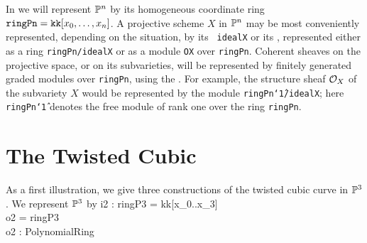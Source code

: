 In \Mtwo we will represent  $\P^n$ by its
homogeneous coordinate ring ${\tt ringPn} = {\tt kk}[x_0,\dots,x_n]$.  A
projective scheme $X$ in $\P^n$ may be most conveniently
represented, depending on the situation, by its  {\tt
idealX} or its , represented either as a
ring {\tt ringPn/idealX} or as a module {\tt OX} over {\tt ringPn}.
Coherent sheaves on the projective space, or on its subvarieties, will
be represented by finitely generated
graded
modules over {\tt ringPn}, using the
.
For example, the structure sheaf $\cO_X$
of the subvariety $X$ would be represented by the module 
{\tt ringPn\char`\^1/idealX}; here {\tt ringPn\char`\^1}
denotes the free module of rank one over the ring
{\tt ringPn}.

\section{The Twisted Cubic}

As a first illustration, we give three constructions
of the twisted cubic
curve in $\P^3$. We represent $\P^3$ by
\beginOutput
i2 : ringP3 = kk[x_0..x_3]\\
\emptyLine
o2 = ringP3\\
\emptyLine
o2 : PolynomialRing\\
\endOutput

